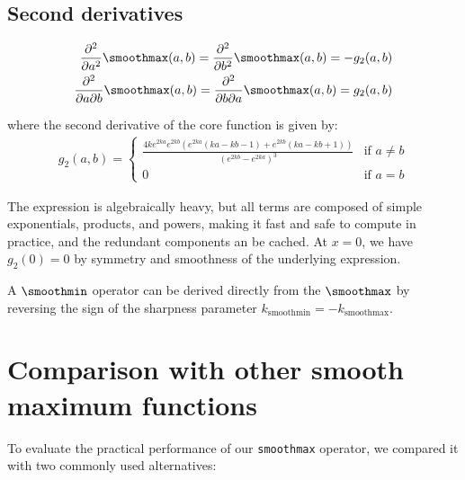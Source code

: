 \subsection*{Second derivatives}
\begin{align}
    \frac{\partial^2}{\partial a^2} \smoothmax(a, b) = \frac{\partial^2}{\partial b^2} \smoothmax(a, b) = - g_2(a, b) \\
    \frac{\partial^2}{\partial a \partial b} \smoothmax(a, b) = \frac{\partial^2}{\partial b \partial a} \smoothmax(a, b) = g_2(a, b)
\end{align}

where the second derivative of the core function is given by:
\begin{align}
    g_2(a, b) = \begin{cases}
        \frac{4ke^{2ka}e^{2kb} \left( e^{2ka} (ka-kb-1) + e^{2kb}(ka - kb + 1) \right)}{\left(e^{2kb}-e^{2ka} \right)^3} &\text{if } a \neq b \\
        0  &\text{if } a = b
    \end{cases}
\end{align}

The expression is algebraically heavy, but all terms are composed of simple exponentials, products, and powers, making it fast and safe to compute in practice, and the redundant components an be cached. At $x = 0$, we have $g_2(0) = 0$ by symmetry and smoothness of the underlying expression.

A $\smoothmin$ operator can be derived directly from the $\smoothmax$ by reversing the sign of the sharpness parameter $k_{\text{smoothmin}} = - k_{\text{smoothmax}}$.



\section{Comparison with other smooth maximum functions}
\label{sec:comparison-smoothmax}

To evaluate the practical performance of our \texttt{smoothmax} operator, we compared it with two commonly used alternatives:

